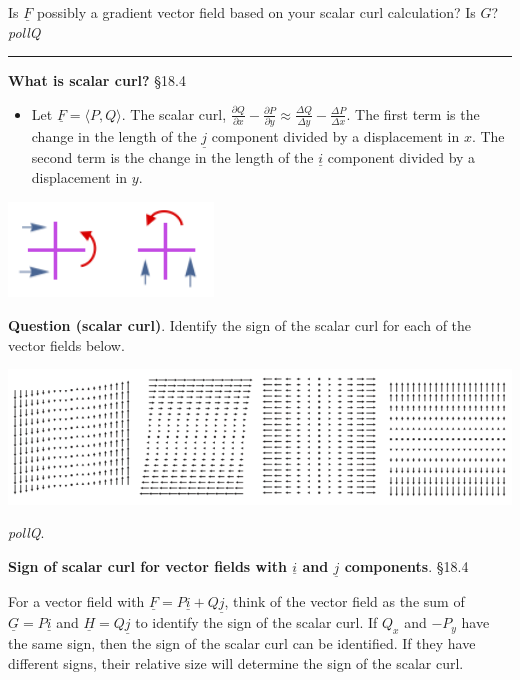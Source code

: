 \documentclass[12pt,letterpaper,noanswers]{exam}
\newcommand{\mb}[1]{\underline{#1}}
\begin{document}
Is $\mb F$ possibly a gradient vector field based on your scalar curl calculation?  Is $G$?
\emph{pollQ}

\vspace{1in}

\vspace{0.2cm}
\hrule
\vspace{0.2cm}
\noindent\textbf{What is scalar curl?} \S 18.4
\begin{tcolorbox}
\begin{itemize}
\itemsep0em
    \item Let $\mb F = \langle P,Q\rangle$.  The scalar curl, $\frac{\partial Q}{\partial x} - \frac{\partial P}{\partial y} \approx \frac{\Delta Q}{\Delta y} - \frac{\Delta P}{\Delta x}$.  The first term is the change in the length of the $\mb j$ component divided by a displacement in $x$.  The second term is the change in the length of the $\mb i$ component divided by a displacement in $y$.
\end{itemize}
\end{tcolorbox}

\includegraphics[height=1in]{img/C28p1-18.png}

\noindent\textbf{Question (scalar curl)}.  Identify the sign of the scalar curl for each of the vector fields below.

\hspace{-0.5in}\includegraphics[width=\linewidth]{img/C24p2b-18.png}

\emph{pollQ}.
\vspace{1in}


\noindent\textbf{Sign of scalar curl for vector fields with $\mb i$ and $\mb j$ components}.  \S 18.4
\begin{tcolorbox}
For a vector field with $\mb F = P\mb i + Q\mb j$, think of the vector field as the sum of $\mb G = P\mb i$ and $\mb H = Q\mb j$ to identify the sign of the scalar curl.  If $Q_x$ and $-P_y$ have the same sign, then the sign of the scalar curl can be identified.  If they have different signs, their relative size will determine the sign of the scalar curl.
\end{tcolorbox}
\end{document}
